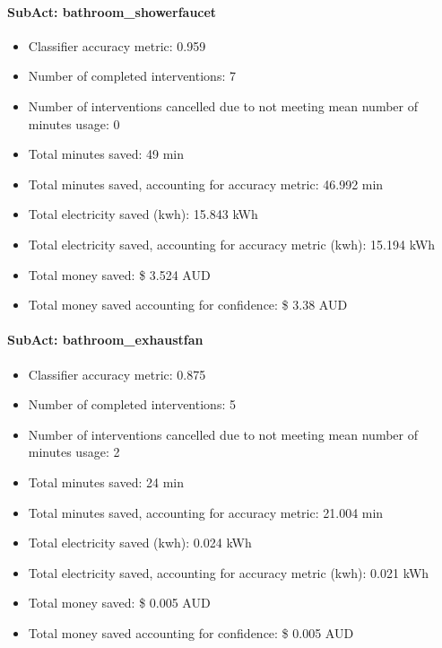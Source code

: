 \documentclass[11pt,]{article}
\providecommand{\tightlist}{%
  \setlength{\itemsep}{0pt}\setlength{\parskip}{0pt}}
\let\oldparagraph\paragraph
\renewcommand{\paragraph}[1]{\oldparagraph{#1}\mbox{}}
\begin{document}
\hypertarget{subact-bathroom_showerfaucet}{%
\paragraph{SubAct:
bathroom\_showerfaucet}\label{subact-bathroom_showerfaucet}}

\begin{itemize}
\tightlist
\item
  Classifier accuracy metric: 0.959
\item
  Number of completed interventions: 7
\item
  Number of interventions cancelled due to not meeting mean number of
  minutes usage: 0
\item
  Total minutes saved: 49 min
\item
  Total minutes saved, accounting for accuracy metric: 46.992 min
\item
  Total electricity saved (kwh): 15.843 kWh
\item
  Total electricity saved, accounting for accuracy metric (kwh): 15.194
  kWh
\item
  Total money saved: \$ 3.524 AUD
\item
  Total money saved accounting for confidence: \$ 3.38 AUD
\end{itemize}

\hypertarget{subact-bathroom_exhaustfan}{%
\paragraph{SubAct:
bathroom\_exhaustfan}\label{subact-bathroom_exhaustfan}}

\begin{itemize}
\tightlist
\item
  Classifier accuracy metric: 0.875
\item
  Number of completed interventions: 5
\item
  Number of interventions cancelled due to not meeting mean number of
  minutes usage: 2
\item
  Total minutes saved: 24 min
\item
  Total minutes saved, accounting for accuracy metric: 21.004 min
\item
  Total electricity saved (kwh): 0.024 kWh
\item
  Total electricity saved, accounting for accuracy metric (kwh): 0.021
  kWh
\item
  Total money saved: \$ 0.005 AUD
\item
  Total money saved accounting for confidence: \$ 0.005 AUD
\end{itemize}
\end{document}

